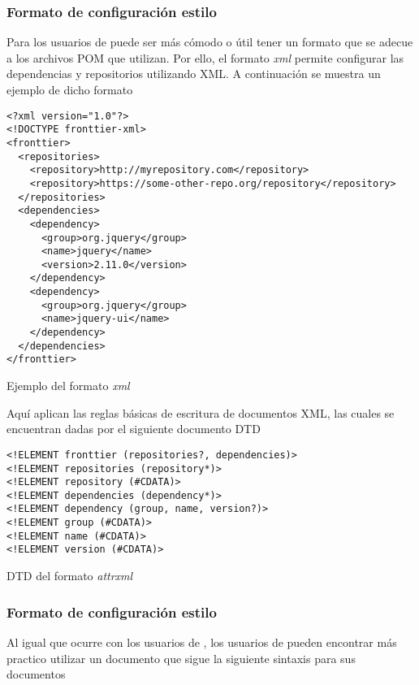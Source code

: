 \subsubsection{Formato de configuración estilo \maven}
\label{subsubsec:formats:mvn}

Para los usuarios de \maven puede ser más cómodo o útil tener un formato que se adecue
a los archivos POM que utilizan. Por ello, el formato \emph{xml} permite configurar las
dependencias y repositorios utilizando XML. A continuación se muestra un ejemplo de dicho
formato

\begin{listing}[ht]
\begin{verbatim}
<?xml version="1.0"?>
<!DOCTYPE fronttier-xml>
<fronttier>
  <repositories>
    <repository>http://myrepository.com</repository>
    <repository>https://some-other-repo.org/repository</repository>
  </repositories>
  <dependencies>
    <dependency>
      <group>org.jquery</group>
      <name>jquery</name>
      <version>2.11.0</version>
    </dependency>
    <dependency>
      <group>org.jquery</group>
      <name>jquery-ui</name>
    </dependency>
  </dependencies>
</fronttier>
\end{verbatim}
\caption{Ejemplo del formato \emph{xml}}
\label{guide:xml:sample}
\end{listing}
Aquí aplican las reglas básicas de escritura de documentos XML, las cuales
se encuentran dadas por el siguiente documento DTD
\begin{listing}[ht]
\begin{verbatim}
<!ELEMENT fronttier (repositories?, dependencies)>
<!ELEMENT repositories (repository*)>
<!ELEMENT repository (#CDATA)>
<!ELEMENT dependencies (dependency*)>
<!ELEMENT dependency (group, name, version?)>
<!ELEMENT group (#CDATA)>
<!ELEMENT name (#CDATA)>
<!ELEMENT version (#CDATA)>
\end{verbatim}
\caption{DTD del formato \emph{attrxml}}
\label{guide:xml:dtd}
\end{listing}

\subsubsection{Formato de configuración estilo \ivy}
\label{subsubsec:formats:ivy}

Al igual que ocurre con los usuarios de \maven, los usuarios de \apache
\ivy pueden encontrar más practico utilizar un documento que sigue la
siguiente sintaxis para sus documentos


